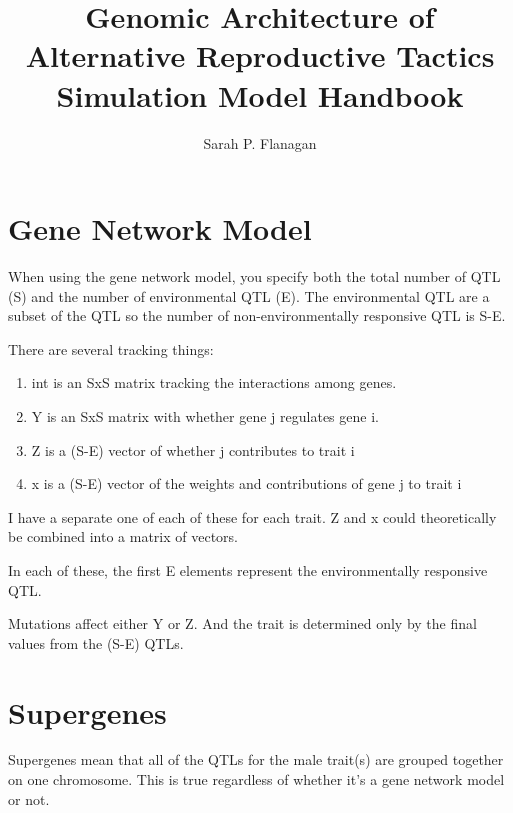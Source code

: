 \documentclass[]{article}
\title{Genomic Architecture of Alternative Reproductive Tactics Simulation Model Handbook}
\author{Sarah P. Flanagan}
\begin{document}
\maketitle

\begin{abstract}

\end{abstract}

\section{Gene Network Model}
When using the gene network model, you specify both the total number of QTL (S) and the number of environmental QTL (E). The environmental QTL are a subset of the QTL so the number of non-environmentally responsive QTL is S-E.

There are several tracking things:

\begin{enumerate}
	\item int is an SxS matrix tracking the interactions among genes.
	\item Y is an SxS matrix with whether gene j regulates gene i.
	\item Z is a (S-E) vector of whether j contributes to trait i
	\item x is a (S-E) vector of the weights and contributions of gene j to trait i
\end{enumerate}

I have a separate one of each of these for each trait. Z and x could theoretically be combined into a matrix of vectors.

In each of these, the first E elements represent the environmentally responsive QTL.

Mutations affect either Y or Z. And the trait is determined only by the final values from the (S-E) QTLs.

\section{Supergenes}
Supergenes mean that all of the QTLs for the male trait(s) are grouped together on one chromosome. This is true regardless of whether it's a gene network model or not.
\end{document}
